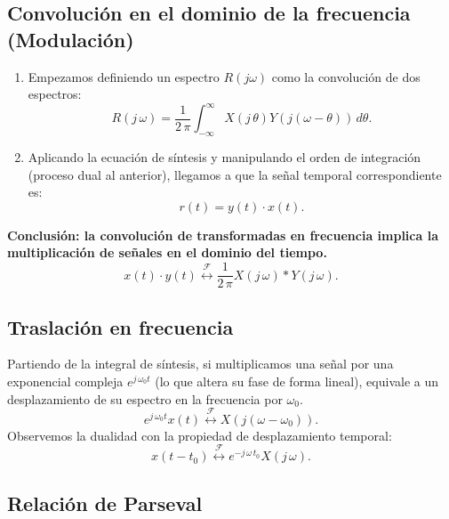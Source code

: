 \documentclass[11pt,a4paper,openany]{book}
\begin{document}
\subsection{Convolución en el dominio de la frecuencia (Modulación)}

\begin{enumerate}
	\item Empezamos definiendo un espectro $R(j\omega)$ como la convolución de dos espectros:
	\begin{equation}
		R(j \, \omega) = \frac{1}{2 \, \pi} \int_{-\infty}^{\infty} X(j \, \theta) Y(j(\omega - \theta)) \, d\theta .
	\end{equation}
	\item Aplicando la ecuación de síntesis y manipulando el orden de integración (proceso dual al anterior), llegamos a que la señal temporal correspondiente es:
	\begin{equation}
		r(t) = y(t) \cdot x(t) .
	\end{equation}
\end{enumerate}

\textbf{Conclusión: la convolución de transformadas en frecuencia implica la multiplicación de señales en el dominio del tiempo.}
\begin{equation}
	x(t) \cdot y(t) \stackrel{\mathcal{F}}{\longleftrightarrow} \frac{1}{2 \, \pi} X(j \, \omega) * Y(j \, \omega).
\end{equation}

\subsection{Traslación en frecuencia}

Partiendo de la integral de síntesis, si multiplicamos una señal por una exponencial compleja $e^{j \, \omega_{0} t}$ (lo que altera su fase de forma lineal), equivale a un desplazamiento de su espectro en la frecuencia por $\omega_0$.
\begin{equation}
	e^{j \, \omega_{0} t} x(t) \stackrel{\mathcal{F}}{\longleftrightarrow} X(j(\omega - \omega_{0})) .
\end{equation}
Observemos la dualidad con la propiedad de desplazamiento temporal:
\begin{equation}
	x(t - t_{0}) \stackrel{\mathcal{F}}{\longleftrightarrow} e^{-j \, \omega \, t_{0}} X(j \, \omega) .
\end{equation}

\subsection{Relación de Parseval}
\end{document}
